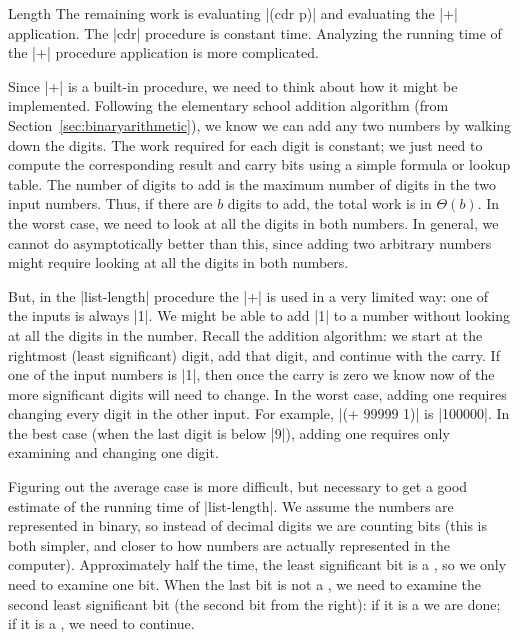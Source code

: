 \begin{schemeregion}
\begin{examplenobar}{Length}
The remaining work is evaluating \scheme|(cdr p)| and evaluating the \scheme|+| application.  The \scheme|cdr| procedure is constant time. 
Analyzing the running time of the \scheme|+| procedure application is more complicated.  

 Since \scheme|+| is a built-in procedure, we need to think about how it might be implemented.  Following the elementary school addition algorithm (from Section~\ref{sec:binaryarithmetic}), we know we can add any two numbers by walking down the digits.  The work required for each digit is constant; we just need to compute the corresponding result and carry bits using a simple formula or lookup table.  The number of digits to add is the maximum number of digits in the two input numbers.    Thus, if there are $b$ digits to add, the total work is in $\Theta(b)$.  In the worst case, we need to look at all the digits in both numbers.  In general, we cannot do asymptotically better than this, since adding two arbitrary numbers might require looking at all the digits in both numbers.  

But, in the \scheme|list-length| procedure the \scheme|+| is used in a very limited way: one of the inputs is always \schemeresult|1|.  We might be able to add \scheme|1| to a number without looking at all the digits in the number.  Recall the addition algorithm: we start at the rightmost (least significant) digit, add that digit, and continue with the carry.  If one of the input numbers is \scheme|1|, then once the carry is zero we know now of the more significant digits will need to change.  In the worst case, adding one requires changing every digit in the other input.  For example, \scheme|(+ 99999 1)| is \scheme|100000|.  In the best case (when the last digit is below \scheme|9|), adding one requires only examining and changing one digit.  
\label{picture:odometer}%

Figuring out the average case is more difficult, but necessary to get a good estimate of the running time of \scheme|list-length|.  We assume the numbers are represented in binary, so instead of decimal digits we are counting bits (this is both simpler, and closer to how numbers are actually represented in the computer).  Approximately half the time, the least significant bit is a , so we only need to examine one bit.  When the last bit is not a , we need to examine the second least significant bit (the second bit from the right): if it is a  we are done; if it is a , we need to continue.  


\end{examplenobar}
\end{schemeregion}
